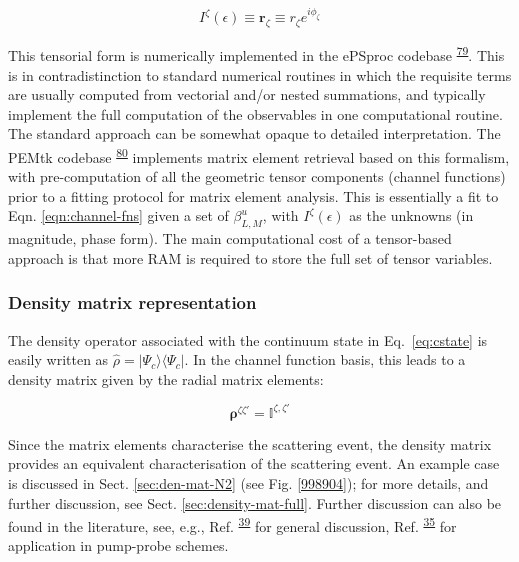 \documentclass[10pt]{article}
\begin{document}
\begin{equation}
I^{\zeta}(\epsilon)\equiv\mathbf{r}_{\zeta}\equiv r_{\zeta}e^{i\phi_{\zeta}}
\end{equation}


This tensorial form is numerically implemented in the ePSproc codebase \textsuperscript{\hyperref[csl:79]{79}}. This is in contradistinction to standard numerical routines in which the requisite terms are usually computed from vectorial and/or nested summations, and typically implement the full computation of the observables in one computational routine. The standard approach can be somewhat opaque to detailed interpretation.  The PEMtk codebase \textsuperscript{\hyperref[csl:80]{80}} implements matrix element retrieval based on this formalism, with pre-computation of all the geometric tensor components (channel functions) prior to a fitting protocol for matrix element analysis. This is essentially a fit to Eqn. \ref{eqn:channel-fns} given a set of $\beta_{L,M}^{u}$, with $I^{\zeta}(\epsilon)$ as the unknowns (in magnitude, phase form). The main computational cost of a tensor-based approach is that more RAM is required to store the full set of tensor variables.

\subsubsection{Density matrix representation\label{sec:density-mat-basic}}
The density operator associated with the continuum state in Eq.~\ref{eq:cstate} is easily written as $\hat{\rho}=|\Psi_c\rangle\langle\Psi_c|$. In the channel function basis, this leads to a density matrix given by the radial matrix elements:

\begin{equation}
\mathbf{\rho}^{\zeta\zeta'} = \mathbb{I}^{\zeta,\zeta'}
\label{eqn:radial-density-mat}
\end{equation}

Since the matrix elements characterise the scattering event, the density matrix provides an equivalent characterisation of the scattering event.
An example case is discussed in Sect. \ref{sec:den-mat-N2} (see Fig. \ref{998904}); for more details, and further discussion, see Sect. \ref{sec:density-mat-full}. Further discussion can also be found in the literature, see, e.g., Ref. \textsuperscript{\hyperref[csl:39]{39}} for general discussion, Ref. \textsuperscript{\hyperref[csl:35]{35}} for application in pump-probe schemes.
\end{document}
